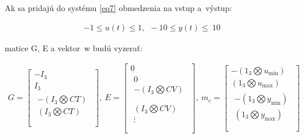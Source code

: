 Ak sa pridajú do systému \ref{eq7} obmedzenia na vstup a~výstup:

\begin{equation} \label{eq20}
\begin{split}
- 1 \leq u\left( t \right) \leq 1,\ \  - 10 \leq y\left( t \right) \leq \ 10
\end{split}
\end{equation}

matice G, E a vektor~w budú vyzerať:

\begin{equation} \label{eq21}
\begin{split}
G = \begin{bmatrix}
{- I}_{3} \\
I_{3} \\
\begin{matrix}
 - (I_{3}\bigotimes CT) \\
(I_{3}\bigotimes CT) \\
\end{matrix} \\
\end{bmatrix},\ E = \begin{bmatrix}
0 \\
\begin{matrix}
0 \\
 - (I_{3}\bigotimes CV) \\
\end{matrix} \\
\begin{matrix}
(I_{3}\bigotimes CV) \\
 \vdots \\
\end{matrix} \\
\end{bmatrix},\ m_{c} = \begin{bmatrix}
 - (1_{3}\bigotimes u_{\min}) \\
(1_{3}\bigotimes u_{\max}) \\
\begin{matrix}
 - (1_{3}\bigotimes y_{\min}) \\
(1_{3}\bigotimes y_{\max}) \\
\end{matrix} \\
\end{bmatrix}
\end{split}
\end{equation}

